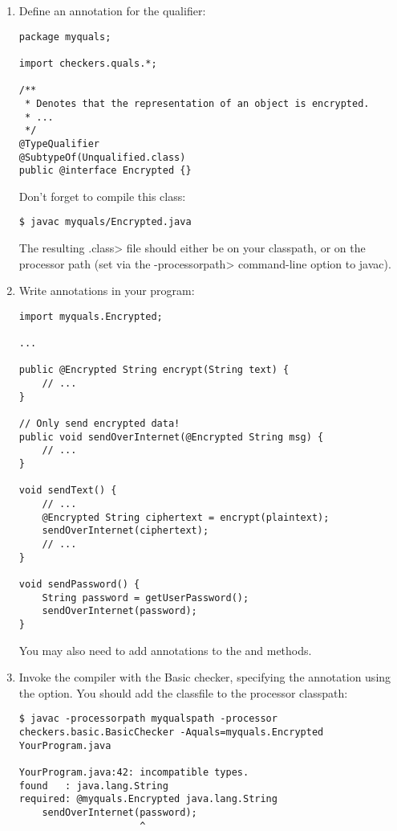 \begin{enumerate}
\item
 Define an annotation for the  qualifier:

\begin{Verbatim}
package myquals;

import checkers.quals.*;

/**
 * Denotes that the representation of an object is encrypted.
 * ...
 */
@TypeQualifier
@SubtypeOf(Unqualified.class)
public @interface Encrypted {}
\end{Verbatim}

Don't forget to compile this class:

\begin{Verbatim}
$ javac myquals/Encrypted.java
\end{Verbatim}

The resulting \<.class> file should either be on your classpath, or on the
processor path (set via the \<-processorpath> command-line option to javac).

\item 
  Write  annotations in your program:

\begin{Verbatim}
import myquals.Encrypted;

...

public @Encrypted String encrypt(String text) {
    // ...
}

// Only send encrypted data!
public void sendOverInternet(@Encrypted String msg) {
    // ...
}

void sendText() {
    // ...
    @Encrypted String ciphertext = encrypt(plaintext);
    sendOverInternet(ciphertext);
    // ...
}

void sendPassword() {
    String password = getUserPassword();
    sendOverInternet(password);
}
\end{Verbatim}

You may also need to add  annotations to the
 and  methods.

\item
  Invoke the compiler with the Basic checker, specifying the
   annotation using the  option.
  You should add the  classfile to the processor classpath:

\begin{Verbatim}
$ javac -processorpath myqualspath -processor checkers.basic.BasicChecker -Aquals=myquals.Encrypted YourProgram.java

YourProgram.java:42: incompatible types.
found   : java.lang.String
required: @myquals.Encrypted java.lang.String
    sendOverInternet(password);
                     ^
\end{Verbatim}

\end{enumerate}



